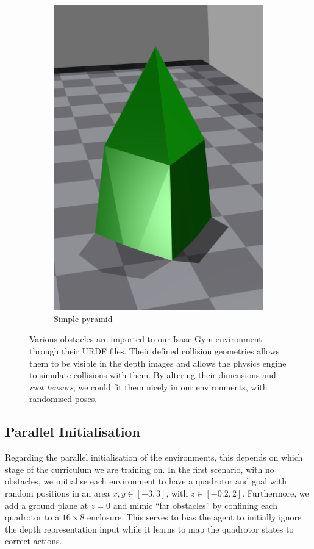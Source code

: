 \begin{figure}[H]
\begin{subfigure}[b]{0.3\textwidth}
         \includegraphics[width=\textwidth]{figures/6_/simple_pyramid.png}
         \caption{Simple pyramid}
         \label{fig:6_obst_simple_pyramid}
     \end{subfigure} 
    \caption{Various obstacles are imported to our Isaac Gym environment through their URDF files. Their defined collision geometries allows them to be visible in the depth images and allows the physics engine to simulate collisions with them. By altering their dimensions and \textit{root tensors}, we could fit them nicely in our environments, with randomised poses.}
     \label{fig:6_obstacles}
\end{figure}

\newpage
\subsection{Parallel Initialisation}
Regarding the parallel initialisation of the environments, this depends on which stage of the curriculum we are training on.
In the first scenario, with no obstacles, we initialise each environment to have a quadrotor and goal with random positions in an area $x, y \in [-3, 3]$, with $z \in [-0.2, 2]$. Furthermore, we add a ground plane at $z = 0$ and mimic ``far obstacles'' by confining each quadrotor to a $16\times8$ enclosure. This serves to bias the agent to initially ignore the depth representation input while it learns to map the quadrotor states to correct actions. 

